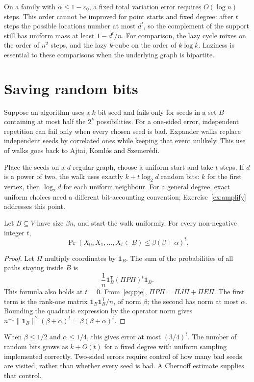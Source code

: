 On a family with $\alpha\le1-\varepsilon_0$, a fixed total variation error requires $O(\log n)$ steps. This order cannot be improved for point starts and fixed degree: after $t$ steps the possible locations number at most $d^t$, so the complement of the support still has uniform mass at least $1-d^t/n$. For comparison, the lazy cycle mixes on the order of $n^2$ steps, and the lazy $k$-cube on the order of $k\log k$. Laziness is essential to these comparisons when the underlying graph is bipartite.

\section{Saving random bits}

Suppose an algorithm uses a $k$-bit seed and fails only for seeds in a set $B$ containing at most half the $2^k$ possibilities. For a one-sided error, independent repetition can fail only when every chosen seed is bad. Expander walks replace independent seeds by correlated ones while keeping that event unlikely. This use of walks goes back to Ajtai, Koml\'os and Szemer\'edi.

Place the seeds on a $d$-regular graph, choose a uniform start and take $t$ steps. If $d$ is a power of two, the walk uses exactly $k+t\log_2d$ random bits: $k$ for the first vertex, then $\log_2d$ for each uniform neighbour. For a general degree, exact uniform choices need a different bit-accounting convention; Exercise~\ref{ex:amplify} addresses this point.

\begin{proposition}\label{prop:hitting}
Let $B\subseteq V$ have size $\beta n$, and start the walk uniformly. For every non-negative integer $t$,
\[
\Pr(X_0,X_1,\ldots,X_t\in B)\le\beta(\beta+\alpha)^t.
\]
\end{proposition}
\begin{proof}
Let $\Pi$ multiply coordinates by $\mathbf1_B$. The sum of the probabilities of all paths staying inside $B$ is
\[
\frac1n\mathbf1_B^{\mathsf T}(\Pi P\Pi)^t\mathbf1_B.
\]
This formula also holds at $t=0$. From~\eqref{eq:pje}, $\Pi P\Pi=\Pi J\Pi+\Pi E\Pi$. The first term is the rank-one matrix $\mathbf1_B\mathbf1_B^{\mathsf T}/n$, of norm $\beta$; the second has norm at most $\alpha$. Bounding the quadratic expression by the operator norm gives
$n^{-1}\|\mathbf1_B\|^2(\beta+\alpha)^t=\beta(\beta+\alpha)^t$.
\end{proof}

When $\beta\le1/2$ and $\alpha\le1/4$, this gives error at most $(3/4)^t$. The number of random bits grows as $k+O(t)$ for a fixed degree with uniform sampling implemented correctly. Two-sided errors require control of how many bad seeds are visited, rather than whether every seed is bad. A Chernoff estimate supplies that control.


